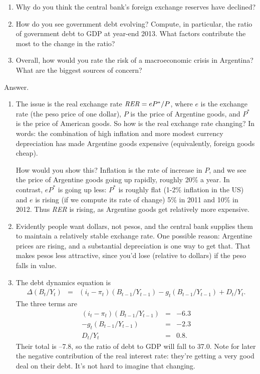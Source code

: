 \begin{enumerate}
\begin{enumerate}
\item Why do you think the central bank's foreign exchange reserves have declined?

\item How do you see government debt evolving?
Compute, in particular, the ratio of government debt to GDP at year-end 2013.
What factors contribute the most to the change in the ratio?

\item Overall, how would you rate the risk of a macroeconomic crisis in Argentina?
What are the biggest sources of concern?
\end{enumerate}

Answer.
\begin{enumerate}
\item
The issue is the real exchange rate
$ \mbox{\em RER\/} = eP^*/P$, where $e$ is the exchange rate
(the peso price of one dollar), 
$P$ is the price of Argentine goods,
and $P^*$ is the price of American goods.
So how is the real exchange rate changing?
In words:  the combination of high inflation and
more modest currency depreciation has made Argentine goods expensive
(equivalently, foreign goods cheap).

How would you show this?  
Inflation is the rate of increase in $P$, 
and we see the price of Argentine goods going up rapidly, roughly 20\% a year.
In contrast, $eP^*$ is going up less:
$P^*$ is roughly flat (1-2\% inflation in the US)
and $e$ is rising (if we compute its rate of change)
5\% in 2011 and 10\% in 2012.
Thus {\it RER\/} is rising, as Argentine goods get relatively more expensive.

\item Evidently people want dollars, not pesos, and the central bank supplies
them to maintain a relatively stable exchange rate.
One possible reason:  Argentine prices are rising,
and a substantial depreciation is one way to get that.
That makes pesos less attractive, since you'd lose (relative to dollars)
if the peso falls in value.

\item The debt dynamics equation is
\begin{eqnarray*}
   \Delta (B_t/Y_t)  &=&  (i_t - \pi_t)(B_{t-1}/Y_{t-1})
                - g_t (B_{t-1}/Y_{t-1}) + D_t/Y_t .
\end{eqnarray*}
The three terms are
\begin{eqnarray*}
    (i_t - \pi_t)(B_{t-1}/Y_{t-1}) &=&  -6.3  \\
    - g_t (B_{t-1}/Y_{t-1})   &=&  -2.3 \\
    D_t/Y_t  &=&  0.8 .
\end{eqnarray*}
Their total is --7.8, so the ratio of debt to GDP will fall to 37.0.
Note for later the negative contribution of the real interest rate:
they're getting a very good deal on their debt.
It's not hard to imagine that changing.  


\end{enumerate}
\end{enumerate}
